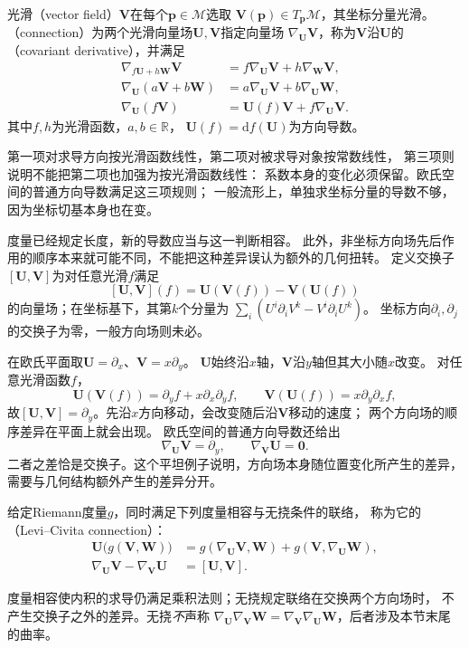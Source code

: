 \begin{definition}[向量场与联络]
\label{def:geometry-connection}
光滑（vector field）$\bm V$在每个$\bm p\in\mathcal M$选取
$\bm V(\bm p)\in T_{\bm p}\mathcal M$，其坐标分量光滑。
（connection）为两个光滑向量场$\bm U,\bm V$指定向量场
$\nabla_{\bm U}\bm V$，称为$\bm V$沿$\bm U$的
（covariant derivative），并满足
\[
 \begin{aligned}
 \nabla_{f\bm U+h\bm W}\bm V
   &=f\nabla_{\bm U}\bm V+h\nabla_{\bm W}\bm V,\\
 \nabla_{\bm U}(a\bm V+b\bm W)
   &=a\nabla_{\bm U}\bm V+b\nabla_{\bm U}\bm W,\\
 \nabla_{\bm U}(f\bm V)
   &=\bm U(f)\bm V+f\nabla_{\bm U}\bm V.
 \end{aligned}
\]
其中$f,h$为光滑函数，$a,b\in\mathbb R$，
$\bm U(f)=\mathrm df(\bm U)$为方向导数。
\end{definition}
第一项对求导方向按光滑函数线性，第二项对被求导对象按常数线性，
第三项则说明不能把第二项也加强为按光滑函数线性：
系数本身的变化必须保留。欧氏空间的普通方向导数满足这三项规则；
一般流形上，单独求坐标分量的导数不够，因为坐标切基本身也在变。

度量已经规定长度，新的导数应当与这一判断相容。
此外，非坐标方向场先后作用的顺序本来就可能不同，不能把这种差异误认为额外的几何扭转。
定义交换子$[\bm U,\bm V]$为对任意光滑$f$满足
\[
 [\bm U,\bm V](f)=\bm U(\bm V(f))-\bm V(\bm U(f))
\]
的向量场；在坐标基下，其第$k$个分量为
$\sum_i(U^i\partial_iV^k-V^i\partial_iU^k)$。
坐标方向$\partial_i,\partial_j$的交换子为零，一般方向场则未必。

\begin{example}[平面上不可交换的方向场]
\label{ex:geometry-plane-field-commutator}
在欧氏平面取$\bm U=\partial_x$、$\bm V=x\partial_y$。
$\bm U$始终沿$x$轴，$\bm V$沿$y$轴但其大小随$x$改变。
对任意光滑函数$f$，
\[
 \bm U(\bm V(f))=\partial_yf+x\partial_x\partial_yf,\qquad
 \bm V(\bm U(f))=x\partial_y\partial_xf,
\]
故$[\bm U,\bm V]=\partial_y$。先沿$x$方向移动，会改变随后沿$\bm V$移动的速度；
两个方向场的顺序差异在平面上就会出现。
欧氏空间的普通方向导数还给出
\[
 \nabla_{\bm U}\bm V=\partial_y,\qquad
 \nabla_{\bm V}\bm U=\bm0.
\]
二者之差恰是交换子。这个平坦例子说明，方向场本身随位置变化所产生的差异，
需要与几何结构额外产生的差异分开。
\end{example}

\begin{definition}
\label{def:geometry-levi-civita-connection}
给定Riemann度量$g$，同时满足下列度量相容与无挠条件的联络，
称为它的（Levi--Civita connection）：
\begin{align*}
 \bm U\bigl(g(\bm V,\bm W)\bigr)
 &=g(\nabla_{\bm U}\bm V,\bm W)+g(\bm V,\nabla_{\bm U}\bm W),\\
 \nabla_{\bm U}\bm V-\nabla_{\bm V}\bm U&=[\bm U,\bm V].
\end{align*}
\end{definition}
度量相容使内积的求导仍满足乘积法则；无挠规定联络在交换两个方向场时，
不产生交换子之外的差异。无挠\emph{不}声称
$\nabla_{\bm U}\nabla_{\bm V}\bm W
=\nabla_{\bm V}\nabla_{\bm U}\bm W$，后者涉及本节末尾的曲率。

